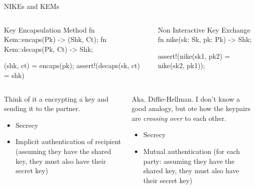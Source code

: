 \begin{frame}[fragile,T]{NIKEs and KEMs}
  \begin{columns}[t,fullwidth]
    \begin{column}{.49\linewidth}
\begin{rustblock}{Key Encapsulation Method}
fn Kem::encaps(Pk) -> (Shk, Ct);
fn Kem::decaps(Pk, Ct) -> Shk;

(shk, ct) = encaps(pk);
assert!(decaps(sk, ct) = shk)
\end{rustblock}
\end{column}\hfill
\begin{column}{.49\linewidth}
\begin{rustblock}{Non Interactive Key Exchange}
fn nike(sk: Sk, pk: Pk) -> Shk;

assert!(nike(sk1, pk2) = nike(sk2, pk1));
\end{rustblock}
\end{column}
\end{columns}
\begin{columns}[t,fullwidth]
\begin{column}{.49\linewidth}
  Think of it a encrypting a key and sending it
        to the partner.

        \begin{itemize}
          \item Secrecy
          \item Implicit authentication of recipient
            (assuming they have the shared key, they must
            also have their secret key)
        \end{itemize}
\end{column}\hfill
\begin{column}{.49\linewidth}
        Aka. Diffie-Hellman.
        I don't know a good analogy, but ote how the
        keypairs are \emph{crossing over} to each other.

        \begin{itemize}
          \item Secrecy
          \item Mutual authentication
            (for each party: assuming they have the shared key, they must
            also have their secret key)
        \end{itemize}
    \end{column}
  \end{columns}
\end{frame}


